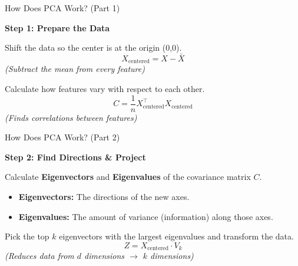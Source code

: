 \begin{frame}{How Does PCA Work? (Part 1)}

\textbf{Step 1: Prepare the Data}

\begin{tcolorbox}[colback=gray!5, colframe=gray!80, title=\textbf{1. Center the Data}]
Shift the data so the center is at the origin (0,0).
\[
X_{\text{centered}} = X - \bar{X}
\]
\small \textit{(Subtract the mean from every feature)}
\end{tcolorbox}

\begin{tcolorbox}[colback=blue!5, colframe=blue!50, title=\textbf{2. Compute Covariance Matrix}]
Calculate how features vary with respect to each other.
\vspace{0.5em}
\[
C = \frac{1}{n} X_{\text{centered}}^\top X_{\text{centered}}
\]
\small \textit{(Finds correlations between features)}
\end{tcolorbox}

\end{frame}

\begin{frame}{How Does PCA Work? (Part 2)}

\textbf{Step 2: Find Directions \& Project}

\begin{tcolorbox}[colback=purple!5, colframe=purple!50, title=\textbf{3. Find Principal Components}]
Calculate \textbf{Eigenvectors} and \textbf{Eigenvalues} of the covariance matrix $C$.
\begin{itemize}
    \item \textbf{Eigenvectors:} The directions of the new axes.
    \item \textbf{Eigenvalues:} The amount of variance (information) along those axes.
\end{itemize}
\end{tcolorbox}

\begin{tcolorbox}[colback=red!5, colframe=red!50, title=\textbf{4. Select \& Project}]
Pick the top $k$ eigenvectors with the largest eigenvalues and transform the data.
\vspace{0.5em}
\[
Z = X_{\text{centered}} \cdot V_k
\]
\small \textit{(Reduces data from $d$ dimensions $\rightarrow$ $k$ dimensions)}
\end{tcolorbox}

\end{frame}

